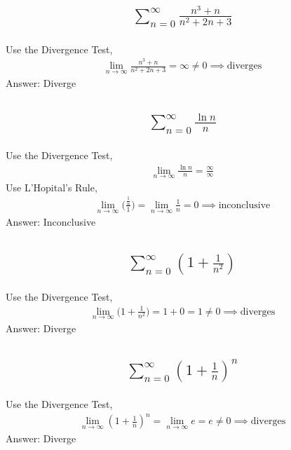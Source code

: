 \documentclass{article}
\begin{document}
\subsection{
	\begin{align*}
		\sum_{n = 0}^\infty \frac{n^3 + n}{n^2 + 2n + 3}
	\end{align*}
}
Use the Divergence Test,
\begin{align*}
	\lim_{n \to \infty} \frac{n^3 + n}{n^2 + 2n + 3} = \infty \neq 0 \implies \text{diverges}
\end{align*}
Answer: Diverge

\subsection{
	\begin{align*}
		\sum_{n = 0}^\infty \frac{\ln{n}}{n}
	\end{align*}
}
Use the Divergence Test,
\begin{align*}
	\lim_{n \to \infty} \frac{\ln{n}}{n} = \frac{\infty}{\infty}
\end{align*}
Use L'Hopital's Rule,
\begin{align*}
	\lim_{n \to \infty} \bigg( \frac{\frac{1}{n}}{1} \bigg) = \lim_{n \to \infty} \frac{1}{n} = 0 \implies \text{inconclusive}
\end{align*}
Answer: Inconclusive

\subsection{
	\begin{align*}
		\sum_{n = 0}^\infty \left( 1 + \frac{1}{n^2} \right)
	\end{align*}
}
Use the Divergence Test,
\begin{align*}
	\lim_{n \to \infty} \bigg( 1 + \frac{1}{n^2} \bigg) = 1 + 0 = 1 \neq 0 \implies \text{diverges}
\end{align*}
Answer: Diverge

\subsection{
	\begin{align*}
		\sum_{n = 0}^\infty \left( 1 + \frac{1}{n} \right)^n
	\end{align*}
}
Use the Divergence Test,
\begin{align*}
	\lim_{n \to \infty} \left( 1 + \frac{1}{n} \right)^n = \lim_{n \to \infty} e = e \neq 0 \implies \text{diverges}
\end{align*}
Answer: Diverge
\end{document}
